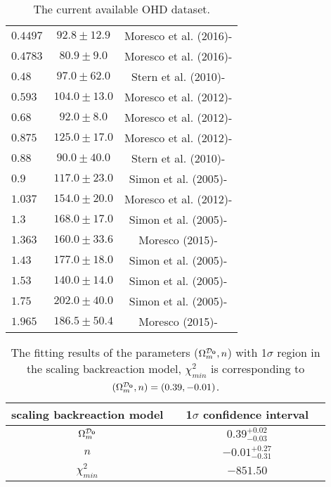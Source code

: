\documentclass[preprint,preprintnumbers, prd, floatfix,  superscriptaddress,nofootinbib] {revtex4-1}
\newcommand{\CD}{{\cal D}}
\newcommand{\now}[1]{{#1_{\rm \bf 0}}}
\begin{document}
\begin{table}
\begin{tabular}{|lcc|}
    $0.4497$     &  $92.8\pm12.9$        &  Moresco et al. (2016)-\cite{Moresco2016}   \\
    $0.4783$     &  $80.9\pm9.0$         &  Moresco et al. (2016)-\cite{Moresco2016}   \\
    $0.48$       &  $97.0\pm62.0$         &  Stern et al. (2010)-\cite{Stern2010}     \\
    $0.593$     &  $104.0\pm13.0$        &  Moresco et al. (2012)-\cite{Moresco2012}   \\
    $0.68$       &  $92.0\pm8.0$        &  Moresco et al. (2012)-\cite{Moresco2012}   \\
    $0.875$     &  $125.0\pm17.0$       &  Moresco et al. (2012)-\cite{Moresco2012}   \\
    $0.88$       &  $90.0\pm40.0$         &  Stern et al. (2010)-\cite{Stern2010}     \\
    $0.9$         &  $117.0\pm23.0$        &  Simon et al. (2005)-\cite{Simon2005}  \\
    $1.037$     &  $154.0\pm20.0$          &  Moresco et al. (2012)-\cite{Moresco2012}   \\
    $1.3$         &  $168.0\pm17.0$        &  Simon et al. (2005)-\cite{Simon2005}     \\
    $1.363$     &  $160.0\pm33.6$          &  Moresco (2015)-\cite{Moresco2015}  \\
    $1.43$       &  $177.0\pm18.0$         &  Simon et al. (2005)-\cite{Simon2005}     \\
    $1.53$       &  $140.0\pm14.0$        &  Simon et al. (2005)-\cite{Simon2005}     \\
    $1.75$       &  $202.0\pm40.0$         &  Simon et al. (2005)-\cite{Simon2005}     \\
    $1.965$     &  $186.5\pm50.4$         &   Moresco (2015)-\cite{Moresco2015}  \\
\hline
\end{tabular}
\caption{\label{tab:1} The current available OHD dataset.}
\end{table}

\begin{table}
\begin{center}
\begin{tabular}{cc|  cc }
\hline\hline scaling backreaction model & &  1$\sigma$ confidence interval
\\ \hline
$\Omega_{m}^{\now\CD}$    && $ 0.39_{-0.03}^{+0.02}$
                     \\
$n$         &&  $-0.01_{-0.31}^{+0.27}$
                     \\
 \hline $\chi^{2}_{min}$  &&  $-851.50$
                      \\
\hline\hline
\end{tabular}
\caption{\label{tab:2} The fitting results of the parameters ($\Omega_{m}^{\now\CD},n$) with 1$\sigma$ region in the scaling backreaction model, $\chi^{2}_{min}$ is corresponding to $(\Omega_{m}^{\now\CD},n)=(0.39,-0.01)$.}
\end{center}
\end{table}
\end{document}

